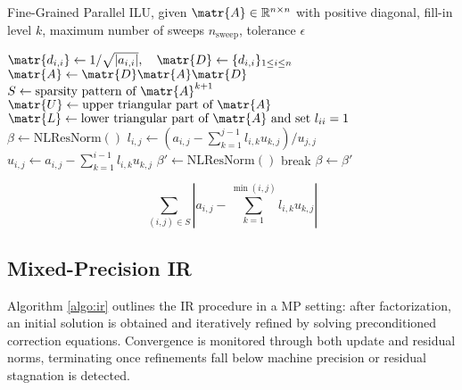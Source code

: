 \begin{singlespace}
  \begin{algorithm}[h]
    \caption{Fine-Grained Parallel ILU, given \(\matr{A} \in \mathbb{R}^{n \times n}\) with
      positive diagonal, fill-in level \(k\), maximum number of sweeps
      \(n_{\text{sweep}}\), tolerance \(\epsilon\)}
    \label{algo:fgpilu}
    \begin{algorithmic}[1]
      \State \(\matr{d_{i,i}} \gets 1 / \sqrt{|a_{i,i}|},\quad \matr{D} \gets \{d_{i,i}\}_{1
        \le i \le n}\) 
      \State \(\matr{A} \gets \matr{D} \matr{A} \matr{D}\)
      \State \(S \gets \text{sparsity pattern of } \matr{A}^{k+1}\)
      \State \(\matr{U} \gets \text{upper triangular part of } \matr{A}\)
      \State \(\matr{L} \gets \text{lower triangular part of } \matr{A}
      \text{ and set } l_{ii} = 1\)
      \State \(\beta \gets \text{NLResNorm}()\) 
            \State \(l_{i,j} \gets (a_{i,j} - \sum_{k=1}^{j-1} l_{i,k}u_{k,j}) / u_{j,j}\)
          \Else
            \State \(u_{i,j} \gets a_{i,j} - \sum_{k=1}^{i-1} l_{i,k}u_{k,j}\)
          \EndIf
        \EndFor
        \State \(\beta' \gets \text{NLResNorm}()\)
          \State break
        \EndIf
        \State \(\beta \gets \beta'\)
      \EndFor

      \vspace{10pt}

        \State \Return
        \[
          \sum_{(i,j) \in S} \left| a_{i,j} - \sum_{k=1}^{\min(i,j)} l_{i,k}u_{k,j} \right|
        \]
      \EndProcedure
      \end{algorithmic}
  \end{algorithm}
\end{singlespace}

\subsection{Mixed-Precision IR}
\label{sec:mixed-precision-ir}

Algorithm \ref{algo:ir} outlines the IR procedure in a MP setting: after
factorization, an initial solution is obtained and iteratively refined by
solving preconditioned correction equations. Convergence is monitored through
both update and residual norms, terminating once refinements fall below machine
precision or residual stagnation is detected.


